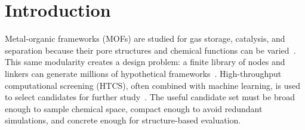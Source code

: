 \documentclass[pdflatex,sn-mathphys-num]{sn-jnl}
\theoremstyle{thmstyleone}%
\begin{document}


\maketitle

\section*{Introduction}
\label{sec:intro}
Metal-organic frameworks (MOFs) are studied for gas storage, catalysis, and separation because their pore structures and chemical functions can be varied~\cite{zhou2012introduction,furukawa2013chemistry}. This same modularity creates a design problem: a finite library of nodes and linkers can generate millions of hypothetical frameworks~\cite{wilmer2012large}. High-throughput computational screening (HTCS), often combined with machine learning, is used to select candidates for further study~\cite{colon2014high, park2024data, kim2025machine}. The useful candidate set must be broad enough to sample chemical space, compact enough to avoid redundant simulations, and concrete enough for structure-based evaluation.
\end{document}
